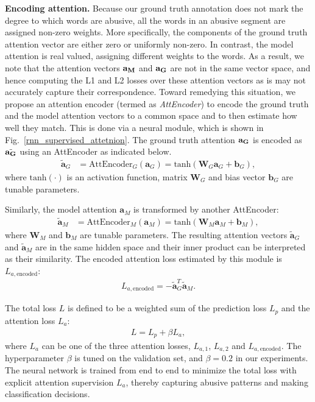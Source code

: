 \documentclass[letterpaper]{article} %
\begin{document}
\noindent\textbf{Encoding attention.}
Because our ground truth annotation  does not mark the degree to which words are abusive, all the words in an abusive segment are assigned non-zero weights. More specifically, the components of the ground truth attention vector are either zero or uniformly non-zero.
In contrast, the model attention is real valued, assigning different weights to the words.
As a result, we note that the attention vectors  $\bf{a}_{M}$ and $\bf{a}_{G}$ are not in the same vector space, and hence computing the L1 and L2 losses over these attention vectors as is may not accurately capture their correspondence. Toward remedying this situation, we propose an attention encoder (termed as \textit{AttEncoder}) to encode the ground truth and the model attention vectors to a common space and to then estimate how well they match. This is done via a neural module, which is shown in Fig.~\ref{rnn_supervised_attetnion}.
The ground truth attention $\bf{a}_{G}$ is encoded as $\tilde{\bf{a}_{G}}$ using an AttEncoder as indicated below.
\begin{align}
\tilde{\mathbf{a}}_{G} &= \text{AttEncoder}_{G}(\mathbf{a}_{G})
= \text{tanh}(\mathbf{W}_{G}\mathbf{a}_{G} + \mathbf{b}_{G}),
\label{eq:proj_ground_attention}
\end{align}
where $\text{tanh}(\cdot)$ is an activation function, matrix $\mathbf{W}_{G}$ and bias vector $\mathbf{b}_{G}$ are tunable parameters.

Similarly, the model attention $\mathbf{a}_{M}$ is transformed by another AttEncoder:
\begin{align}
\label{eq:proj_model_attention}
\tilde{\mathbf{a}}_{M} &= \text{AttEncoder}_{M}(\mathbf{a}_{M})
= \text{tanh}(\mathbf{W}_{M}\mathbf{a}_{M} + \mathbf{b}_{M}),
\end{align}
where $\mathbf{W}_{M}$ and $\mathbf{b}_{M}$ are tunable parameters.
The resulting attention vectors $\tilde{\mathbf{a}}_{G}$ and $\tilde{\mathbf{a}}_{M}$ are in the same hidden space and their inner product can be interpreted as their similarity. The encoded attention loss estimated by this  module is $L_{a,\text{encoded}}$:
\begin{align}
L_{a,\text{encoded}} = -\tilde{\mathbf{a}}_{G}^{T}\tilde{\mathbf{a}}_{M}.
\end{align}


The total loss $L$ is defined to be a weighted sum of the prediction loss $L_p$ and the attention loss $L_a$:
\begin{align}
L = L_{p} + \beta L_{a},
\end{align}
{where $L_{a}$ can be one of the three attention losses, $L_{a,1}$, $L_{a,2}$ and $L_{a,\text{encoded}}$.}
The hyperparameter $\beta$ is tuned on the validation set, and $\beta=0.2$ in our experiments. The neural network is trained  from end to end to minimize the total loss with explicit attention supervision $L_{a}$, thereby capturing abusive patterns and making classification decisions.
\end{document}
